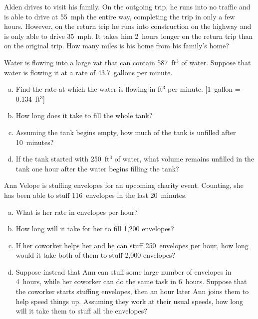 \documentclass[11pt,letterpaper]{article}
\begin{document}
\newpage



 Alden drives to visit his family. On the outgoing trip, he runs into no traffic and is able to drive at 55~mph the entire way, completing the trip in only a few hours. However, on the return trip he runs into construction on the highway and is only able to drive 35~mph. It takes him 2~hours longer on the return trip than on the original trip. How many miles is his home from his family's home?



\newpage



 Water is flowing into a large vat that can contain 587~ft$^3$ of water. Suppose that water is flowing it at a rate of 43.7~gallons per minute. 
	\begin{enumerate}[(a)]
	\item Find the rate at which the water is flowing in ft$^3$ per minute. [1~gallon = 0.134~ft$^3$]
	\item How long does it take to fill the whole tank?
	\item Assuming the tank begins empty, how much of the tank is unfilled after 10~minutes?
	\item If the tank started with 250~ft$^3$ of water, what volume remains unfilled in the tank one hour after the water begins filling the tank?
	\end{enumerate}



\newpage



 Ann Velope is stuffing envelopes for an upcoming charity event. Counting, she has been able to stuff 116~envelopes in the last 20~minutes. 
	\begin{enumerate}[(a)]
	\item What is her rate in envelopes per hour?
	\item How long will it take for her to fill 1,200 envelopes? 
	\item If her coworker helps her and he can stuff 250~envelopes per hour, how long would it take both of them to stuff 2,000 envelopes? 
	\item Suppose instead that Ann can stuff some large number of envelopes in 4~hours, while her coworker can do the same task in 6~hours. Suppose that the coworker starts stuffing envelopes, then an hour later Ann joins them to help speed things up. Assuming they work at their usual speeds, how long will it take them to stuff all the envelopes?
	\end{enumerate}
\end{document}
